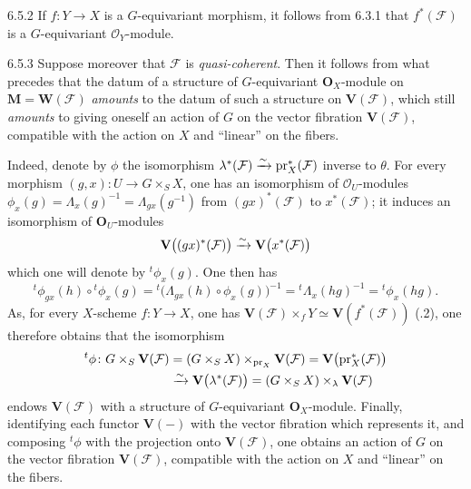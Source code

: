 \begin{remark}{6.5.2}\label{I.6.5.2}
If \(f\colon Y\to X\) is a \(G\)-equivariant morphism, it follows from 6.3.1
that \(f^{*}(\mathcal{F})\) is a \(G\)-equivariant \(\mathcal{O}_{Y}\)-module.
\end{remark}

\begin{remark}{6.5.3}\label{I.6.5.3}
Suppose moreover that \(\mathcal{F}\) is \emph{quasi-coherent}. Then it
follows from what precedes that the datum of a structure of \(G\)-equivariant
\(\mathbf{O}_{X}\)-module on \(\mathbf{M}=\mathbf{W}(\mathcal{F})\)
\emph{amounts} to the datum of such a structure on \(\mathbf{V}(\mathcal{F})\),
which still \emph{amounts} to giving oneself an action of \(G\) on the vector
fibration \(\mathbf{V}(\mathcal{F})\), compatible with the action on \(X\) and
``linear'' on the fibers.

Indeed, denote by \(\phi\) the isomorphism
\(\lambda^{*}(\mathcal{F})\xrightarrow{\sim}\mathrm{pr}_{X}^{*}(\mathcal{F})\) inverse to
\(\theta\). For every morphism \((g,x)\colon U\to G\times_{S}X\), one has an
isomorphism of \(\mathcal{O}_{U}\)-modules
\(\phi_{x}(g)=\Lambda_{x}(g)^{-1}=\Lambda_{gx}(g^{-1})\) from
\((gx)^{*}(\mathcal{F})\) to \(x^{*}(\mathcal{F})\); it induces an isomorphism
of \(\mathbf{O}_{U}\)-modules
\[
\mathbf{V}\bigl((gx)^{*}(\mathcal{F})\bigr)
  \xrightarrow{\sim}\mathbf{V}\bigl(x^{*}(\mathcal{F})\bigr)
\]
which one will denote by \({}^{t}\phi_{x}(g)\). One then has
\[
{}^{t}\phi_{gx}(h)\circ{}^{t}\phi_{x}(g)
  ={}^{t}\bigl(\Lambda_{gx}(h)\circ\phi_{x}(g)\bigr)^{-1}
  ={}^{t}\Lambda_{x}(hg)^{-1}
  ={}^{t}\phi_{x}(hg).
\]
As, for every \(X\)-scheme \(f\colon Y\to X\), one has
\(\mathbf{V}(\mathcal{F})\times_{f}Y\simeq\mathbf{V}(f^{*}(\mathcal{F}))\)
(.2), one therefore obtains that the isomorphism
\begin{align*}
{}^{t}\phi\colon
  G\times_{S}\mathbf{V}(\mathcal{F})
  &=(G\times_{S}X)\times_{\mathrm{pr}_{X}}\mathbf{V}(\mathcal{F})
   =\mathbf{V}\bigl(\mathrm{pr}_{X}^{*}(\mathcal{F})\bigr) \\
  &\xrightarrow{\sim}\mathbf{V}\bigl(\lambda^{*}(\mathcal{F})\bigr)
   =(G\times_{S}X)\times_{\lambda}\mathbf{V}(\mathcal{F})
\end{align*}
endows \(\mathbf{V}(\mathcal{F})\) with a structure of \(G\)-equivariant
\(\mathbf{O}_{X}\)-module. Finally, identifying each functor
\(\mathbf{V}(-)\) with the vector fibration which represents it, and composing
\({}^{t}\phi\) with the projection onto \(\mathbf{V}(\mathcal{F})\), one
obtains an action of \(G\) on the vector fibration \(\mathbf{V}(\mathcal{F})\),
compatible with the action on \(X\) and ``linear'' on the fibers.


\end{remark}
